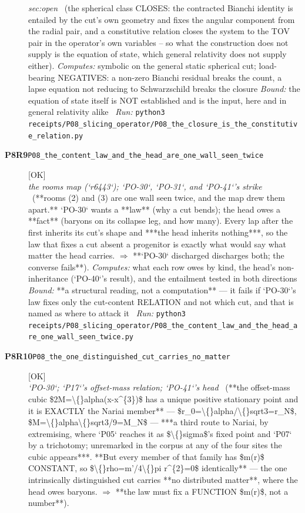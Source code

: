 \begin{description}
\textit{sec:open} \ (the spherical class CLOSES: the contracted Bianchi identity is entailed by the cut's own geometry and fixes the angular component from the radial pair, and a constitutive relation closes the system to the TOV pair in the operator's own variables -- so what the construction does not supply is the equation of state, which general relativity does not supply either). 
\emph{Computes:} symbolic on the general static spherical cut; load-bearing NEGATIVES: a non-zero Bianchi residual breaks the count, a lapse equation not reducing to Schwarzschild breaks the closure
 \emph{Bound:} the equation of state itself is NOT established and is the input, here and in general relativity alike
\ \emph{Run:} \texttt{python3 receipts/P08\_slicing\_operator/P08\_the\_closure\_is\_the\_constitutive\_relation.py}
\item[\rcptlabel{P08_the_content_law_and_the_head_are_one_wall_seen_twice}{P8R9}\textbf{P8R9}\quad\texttt{P08\_the\_content\_law\_and\_the\_head\_are\_one\_wall\_seen\_twice}]\hfill\textsf{[OK]}\\
\textit{the rooms map (`r6443`); `PO-30`, `PO-31`, and `PO-41`'s strike} \ (**rooms (2) and (3) are one wall seen twice, and the map drew them apart.** `PO-30` wants a **law** (why a cut bends); the head owes a **fact** (baryons on its collapse leg, and how many). Every lap after the first inherits its cut's shape and ***the head inherits nothing***, so the law that fixes a cut absent a progenitor is exactly what would say what matter the head carries. \ensuremath{\Rightarrow} **`PO-30` discharged discharges both; the converse fails**). 
\emph{Computes:} what each row owes by kind, the head's non-inheritance (`PO-40`'s result), and the entailment tested in both directions
 \emph{Bound:}  **a structural reading, not a computation** --- it fails if `PO-30`'s law fixes only the cut-content RELATION and not which cut, and that is named as where to attack it
\ \emph{Run:} \texttt{python3 receipts/P08\_slicing\_operator/P08\_the\_content\_law\_and\_the\_head\_are\_one\_wall\_seen\_twice.py}
\item[\rcptlabel{P08_the_one_distinguished_cut_carries_no_matter}{P8R10}\textbf{P8R10}\quad\texttt{P08\_the\_one\_distinguished\_cut\_carries\_no\_matter}]\hfill\textsf{[OK]}\\
\textit{`PO-30`; `P17`'s offset-mass relation; `PO-41`'s head} \ (**the offset-mass cubic \$2M=\textbackslash\{\}alpha(x-x\textasciicircum{}\{3\})\$ has a unique positive stationary point and it is EXACTLY the Nariai member** --- \$r\_0=\textbackslash\{\}alpha/\textbackslash\{\}sqrt3=r\_N\$, \$M=\textbackslash\{\}alpha\textbackslash\{\}sqrt3/9=M\_N\$ --- ***a third route to Nariai, by extremising, where `P05` reaches it as \$\textbackslash\{\}sigma\$'s fixed point and `P07` by a trichotomy; unremarked in the corpus at any of the four sites the cubic appears***. **But every member of that family has \$m(r)\$ CONSTANT, so \$\textbackslash\{\}rho=m'/4\textbackslash\{\}pi r\textasciicircum{}\{2\}=0\$ identically** --- the one intrinsically distinguished cut carries **no distributed matter**, where the head owes baryons. \ensuremath{\Rightarrow} **the law must fix a FUNCTION \$m(r)\$, not a number**). 

\end{description}

